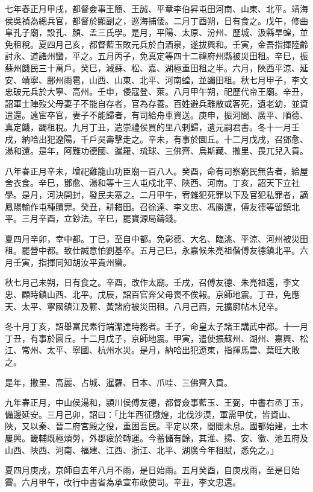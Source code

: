 \begin{pinyinscope}
七年春正月甲戌，都督僉事王簡、王誠、平章李伯昇屯田河南、山東、北平。靖海侯吳禎為總兵官，都督於顯副之，巡海捕倭。二月丁酉朔，日有食之。戊午，修曲阜孔子廟，設孔、顏、孟三氏學。是月，平陽、太原、汾州、歷城、汲縣旱蝗，並免租稅。夏四月己亥，都督藍玉敗元兵於白酒泉，遂拔興和。壬寅，金吾指揮陸齡討永、道諸州蠻，平之。五月丙子，免真定等四十二禕府州縣被災田租。辛巳，振蘇州饑民三十萬戶。癸巳，減蘇、松、嘉、湖極重田租之半。六月，陜西平涼、延安、靖寧、鄜州雨雹，山西、山東、北平、河南蝗，並蠲田租。秋七月甲子，李文忠破元兵於大寧、高州。壬申，倭寇登、萊。八月甲午朔，祀歷代帝王廟。辛丑，詔軍士陣歿父母妻子不能自存者，官為存養。百姓避兵離散或客死，遺老幼，並資遣還。遠宦卒官，妻子不能歸者，有司給舟車資送。庚申，振河間、廣平、順德、真定饑，蠲租稅。九月丁丑，遣崇禮侯買的里八剌歸，遺元嗣君書。冬十一月壬戌，納哈出犯遼陽，千戶吳壽擊走之。辛未，有事於圜丘。十二月戊戌，召鄧愈、湯和還。是年，阿難功德國、暹羅、琉球、三佛齊、烏斯藏、撒里、畏兀兒入貢。

八年春正月辛未，增祀雞籠山功臣廟一百八人。癸酉，命有司察窮民無告者，給屋舍衣食。辛巳，鄧愈、湯和等十三人屯戍北平、陜西、河南。丁亥，詔天下立社學。是月，河決開封，發民夫塞之。二月甲午，宥雜犯死罪以下及官犯私罪者，謫鳳陽輸作屯種贖罪。癸丑，耕耤田。召徐達、李文忠、馮勝還，傅友德等留鎮北平。三月辛酉，立鈔法。辛巳，罷寶源局鑄錢。

夏四月辛卯，幸中都。丁巳，至自中都。免彰德、大名、臨洮、平涼、河州被災田租。罷營中都。致仕誠意怕劉基卒。五月己巳，永嘉候朱亮祖偕傅友德鎮北平。六月壬寅，指揮同知胡汝平貴州蠻。

秋七月己未朔，日有食之。辛酉，改作太廟。壬戌，召傅友德、朱亮祖還，李文忠、顧時鎮山西、北平。戊辰，詔百官奔父母喪不俟報。京師地震。丁丑，免應天、太平、寧國鎮江及蘄、黃諸府被災田租。八月己酉，元擴廓帖木兒卒。

冬十月丁亥，詔舉富民素行端潔達時務者。壬子，命皇太子諸王講武中都。十一月丁丑，有事於圓丘。十二月戊子，京師地震。甲寅，遣使振蘇州、湖州、嘉興、松江、常州、太平、寧國、杭州水災。是月，納哈出犯遼東，指揮馬雲、葉旺大敗之。

是年，撒里、高麗、占城、暹羅、日本、爪哇、三佛齊入貢。

九年春正月，中山侯湯和，潁川侯傅友德，都督僉事藍玉、王弼，中書右丞丁玉，備邊延安。三月己卯，詔曰：「比年西征燉煌，北伐沙漠，軍需甲仗，皆資山、陜，又以秦、晉二府宮殿之役，重困吾民。平定以來，閭閻未息。國都始建，土木屢興。畿輔既極煩勞，外郡疲於轉運。今蓄儲有餘，其淮、揚、安、徽、池五府及山西、陜西、河南、福建、江西、浙江、北平、湖廣今年租賦，悉免之。」

夏四月庚戌，京師自去年八月不雨，是日始雨。五月癸酉，自庚戌雨，至是日始霽。六月甲午，改行中書省為承宣布政使司。辛丑，李文忠還。


\end{pinyinscope}
